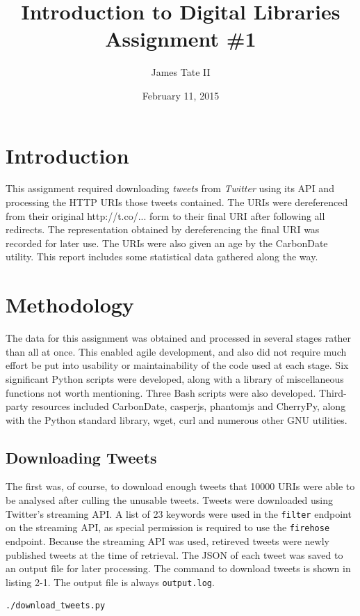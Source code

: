 \documentclass[a4paper,12pt]{article}
\begin{document}
\renewcommand{\thelstlisting}{\thesection-\arabic{lstlisting}}
\renewcommand{\thefigure}{\arabic{section}-\arabic{figure}}
\setlength{\floatsep}{0pt plus 2pt minus 2pt}

\title{Introduction to Digital Libraries Assignment \#1}
\date{February 11, 2015}
\author{James Tate II}
\maketitle

\section{Introduction}
This assignment required downloading \emph{tweets} from \emph{Twitter} using its API and processing the HTTP URIs
those tweets contained. The URIs were dereferenced from their original http://t.co/... form to their final
URI after following all redirects. The representation obtained by dereferencing the final URI was recorded
for later use. The URIs were also given an age by the CarbonDate utility. This report includes some statistical
data gathered along the way.

\section{Methodology}
The data for this assignment was obtained and processed in several stages rather than all at once. 
This enabled agile development, and also did not require much effort be put into usability or maintainability 
of the code used at each stage. Six significant Python scripts were developed, along with a library of
miscellaneous functions not worth mentioning. Three Bash scripts were also developed. Third-party resources
included CarbonDate, casperjs, phantomjs and CherryPy, along with the Python standard library, wget, curl and numerous other GNU utilities.

\subsection{Downloading Tweets}
The first was, of course, to download enough tweets that 10000 URIs were able to be analysed after culling
the unusable tweets. Tweets were downloaded using Twitter's streaming API. A list of 23 keywords were used in
the \texttt{filter} endpoint on the streaming API, as special permission is required to use the \texttt{firehose}
endpoint. Because the streaming API was used, retireved tweets were newly published tweets at the time of
retrieval. The JSON of each tweet was saved to an output file for later processing. The command to download
tweets is shown in listing 2-1. The output file is always \texttt{output.log}.
\begin{lstlisting}[basicstyle=\ttfamily,caption={Downloading Tweets}]
    ./download_tweets.py
\end{lstlisting}
\end{document}
